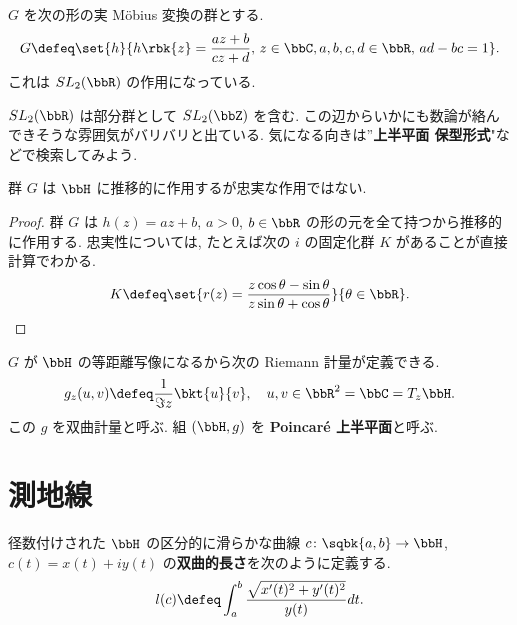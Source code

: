\documentclass[openany, a4paper, oneside]{jsbook}
\begin{document}
\begin{defn}[M\"obius 変換]\label{introduction-to-hyperbolic-geometry5}
 $G$ を次の形の実 M\"obius 変換の群とする.
\begin{align}
 G
 \defeq
 \set{h}{h \rbk{z} = \frac{az + b}{cz + d}, \, z \in \bbC, a,b,c,d \in \bbR, \, ad - bc = 1}.
\end{align}
これは $SL_2(\bbR)$ の作用になっている.
\end{defn}
\begin{rem}
 $SL_2(\bbR)$ は部分群として $SL_2(\bbZ)$ を含む.
 この辺からいかにも数論が絡んできそうな雰囲気がバリバリと出ている.
 気になる向きは''\textbf{上半平面 保型形式}"などで検索してみよう.
\end{rem}
\begin{prop}\label{introduction-to-hyperbolic-geometry6}
 群 $G$ は $\bbH$ に推移的に作用するが忠実な作用ではない.
\end{prop}
\begin{proof}
群 $G$ は $h(z) = az + b$, $a > 0$, $b \in \bbR$ の形の元を全て持つから推移的に作用する.
忠実性については, たとえば次の $i$ の固定化群 $K$ があることが直接計算でわかる.
\begin{align}
 K
 \defeq
 \set{r(z) = \frac{z \cos \theta - \sin \theta}{z \sin \theta + \cos \theta}}{\theta \in \bbR}.
\end{align}
\end{proof}

$G$ が $\bbH$ の等距離写像になるから次の Riemann 計量が定義できる.
\begin{align}
 g_z (u, v)
 \defeq
 \frac{1}{\Im z} \bkt{u}{v}, \quad u, v \in \bbR^2 = \bbC = T_z \bbH.
\end{align}
この $g$ を双曲計量と呼ぶ.
組 $(\bbH, g)$ を \textbf{Poincar\'e 上半平面}と呼ぶ.
\section{測地線\label{introduction-to-hyperbolic-geometry7}}

径数付けされた $\bbH$ の区分的に滑らかな曲線 $c \colon \sqbk{a, b} \to \bbH$,
$c(t) = x(t) + i y(t)$ の\textbf{双曲的長さ}を次のように定義する.
\begin{align}
 l (c)
 \defeq
 \int_a^b \frac{\sqrt{x'(t)^2 + y'(t)^2}}{y(t)} dt.
\end{align}
\end{document}
